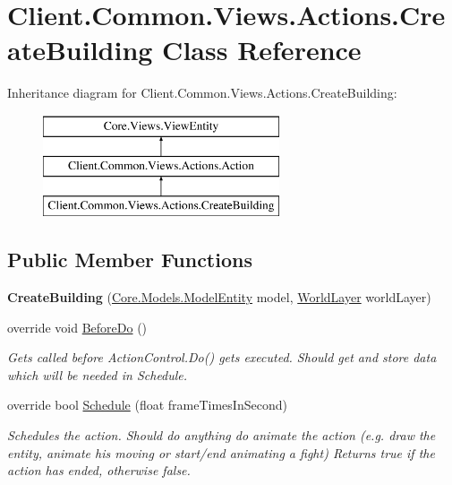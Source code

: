 \hypertarget{classClient_1_1Common_1_1Views_1_1Actions_1_1CreateBuilding}{\section{Client.\-Common.\-Views.\-Actions.\-Create\-Building Class Reference}
\label{classClient_1_1Common_1_1Views_1_1Actions_1_1CreateBuilding}
}
Inheritance diagram for Client.\-Common.\-Views.\-Actions.\-Create\-Building\-:\begin{figure}[H]
\begin{center}
\leavevmode
\includegraphics[height=3.000000cm]{classClient_1_1Common_1_1Views_1_1Actions_1_1CreateBuilding}
\end{center}
\end{figure}
\subsection*{Public Member Functions}
\begin{DoxyCompactItemize}
\item 
\hypertarget{classClient_1_1Common_1_1Views_1_1Actions_1_1CreateBuilding_a556c04d72e703f4dca58c8861d6b4b83}{{\bfseries Create\-Building} (\hyperlink{classCore_1_1Models_1_1ModelEntity}{Core.\-Models.\-Model\-Entity} model, \hyperlink{classClient_1_1Common_1_1Views_1_1WorldLayer}{World\-Layer} world\-Layer)}\label{classClient_1_1Common_1_1Views_1_1Actions_1_1CreateBuilding_a556c04d72e703f4dca58c8861d6b4b83}

\item 
override void \hyperlink{classClient_1_1Common_1_1Views_1_1Actions_1_1CreateBuilding_ac4ae114e1751a82e521cb3dfbc346e49}{Before\-Do} ()
\begin{DoxyCompactList}\small\item\em Gets called before Action\-Control.\-Do() gets executed. Should get and store data which will be needed in Schedule. \end{DoxyCompactList}\item 
override bool \hyperlink{classClient_1_1Common_1_1Views_1_1Actions_1_1CreateBuilding_a9124e0ed7b33ef3b674613b9dbda626f}{Schedule} (float frame\-Times\-In\-Second)
\begin{DoxyCompactList}\small\item\em Schedules the action. Should do anything do animate the action (e.\-g. draw the entity, animate his moving or start/end animating a fight) Returns true if the action has ended, otherwise false. \end{DoxyCompactList}\end{DoxyCompactItemize}
